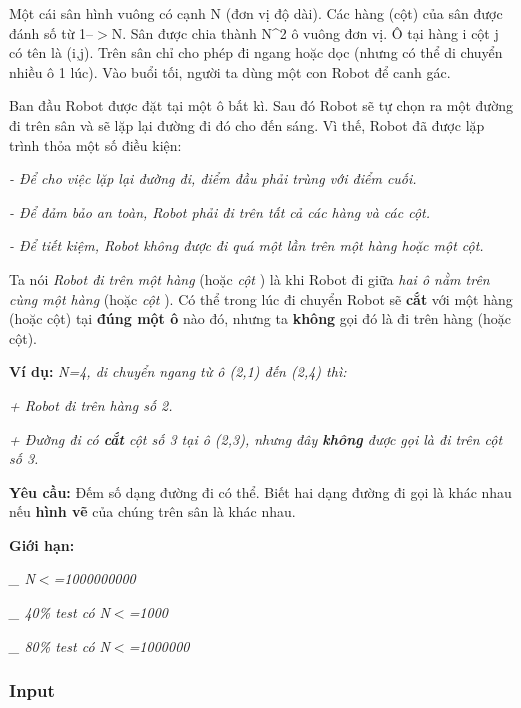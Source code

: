 



   Một cái sân hình vuông có cạnh N (đơn vị độ dài). Các hàng (cột) của sân được đánh số từ 1--$>$N. Sân được chia thành N\textasciicircum2 ô vuông đơn vị. Ô tại hàng i cột j có tên là (i,j). Trên sân chỉ cho phép đi ngang hoặc dọc (nhưng có thể di chuyển nhiều ô 1 lúc). Vào buổi tối, người ta dùng một con Robot để canh gác.  

   Ban đầu Robot được đặt tại một ô bất kì. Sau đó Robot sẽ tự chọn ra một đường đi trên sân và sẽ lặp lại đường đi đó cho đến sáng. Vì thế, Robot đã được lặp trình thỏa một số điều kiện:  

\emph{    - Để cho việc lặp lại đường đi, điểm đầu phải trùng với điểm cuối.   }

\emph{    - Để đảm bảo an toàn, Robot phải đi trên tất cả các hàng và các cột.    
\\}

\emph{    - Để tiết kiệm, Robot không được đi quá một lần trên một hàng hoặc một cột.   }

   Ta nói   \emph{    Robot đi trên một hàng   }   (hoặc   \emph{    cột   }   ) là khi Robot đi giữa   \emph{    hai ô nằm trên cùng một hàng   }   (hoặc   \emph{    cột   }   ). Có thể trong lúc đi chuyển Robot sẽ   \textbf{    cắt   }   với một hàng (hoặc cột) tại   \textbf{    đúng một ô   }   nào đó, nhưng ta   \textbf{    không   }   gọi đó là đi trên hàng (hoặc cột).  

\textbf{     Ví dụ:    }\emph{    N=4, di chuyển ngang từ ô (2,1) đến (2,4) thì:   }

\emph{    + Robot đi trên hàng số 2.   }

\emph{    + Đường đi có    \textbf{     cắt    }    cột số 3 tại ô (2,3), nhưng đây    \textbf{     không    }    được gọi là đi trên cột số 3.   }

\textbf{      Yêu cầu:     }   Đếm số dạng đường đi có thể. Biết hai dạng đường đi gọi là khác nhau nếu   \textbf{    hình vẽ   }   của chúng trên sân là khác nhau.  

\textbf{      Giới hạn:     }

\emph{    \_ N$<$=1000000000   }

\emph{    \_ 40\% test có N$<$=1000   }

\emph{    \_ 80\% test có N$<$=1000000   }

\subsubsection{   Input  }

